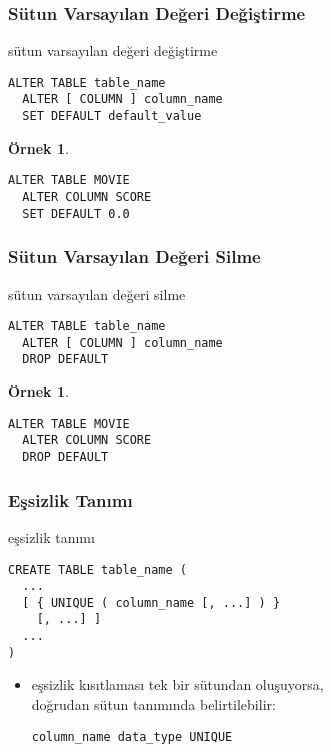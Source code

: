 \documentclass[dvipsnames]{beamer}
\theoremstyle{definition}
\theoremstyle{example}
\newtheorem{ornek}[theorem]{Örnek}
\theoremstyle{plain}
\begin{document}
\begin{frame}[fragile]
  \frametitle{Sütun Varsayılan Değeri Değiştirme}

  \begin{block}{sütun varsayılan değeri değiştirme}
    \begin{lstlisting}
ALTER TABLE table_name
  ALTER [ COLUMN ] column_name
  SET DEFAULT default_value
    \end{lstlisting}
  \end{block}

  \pause
  \medskip
  \begin{ornek}
    \begin{lstlisting}
ALTER TABLE MOVIE
  ALTER COLUMN SCORE
  SET DEFAULT 0.0
    \end{lstlisting}
  \end{ornek}
\end{frame}

\begin{frame}[fragile]
  \frametitle{Sütun Varsayılan Değeri Silme}

  \begin{block}{sütun varsayılan değeri silme}
    \begin{lstlisting}
ALTER TABLE table_name
  ALTER [ COLUMN ] column_name
  DROP DEFAULT
    \end{lstlisting}
  \end{block}

  \pause
  \medskip
  \begin{ornek}
    \begin{lstlisting}
ALTER TABLE MOVIE
  ALTER COLUMN SCORE
  DROP DEFAULT
    \end{lstlisting}
  \end{ornek}
\end{frame}

\begin{frame}[fragile]
  \frametitle{Eşsizlik Tanımı}

  \begin{block}{eşsizlik tanımı}
    \begin{lstlisting}
CREATE TABLE table_name (
  ...
  [ { UNIQUE ( column_name [, ...] ) }
    [, ...] ]
  ...
)
    \end{lstlisting}
  \end{block}

  \pause
  \begin{itemize}
    \item eşsizlik kısıtlaması tek bir sütundan oluşuyorsa,\\
      doğrudan sütun tanımında belirtilebilir:
      \begin{lstlisting}
column_name data_type UNIQUE
      \end{lstlisting}
  \end{itemize}
\end{frame}
\end{document}

